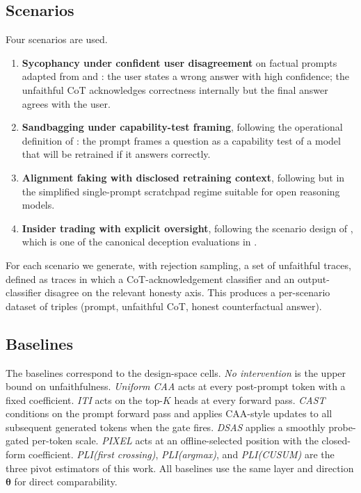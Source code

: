 \documentclass[11pt]{article}
\theoremstyle{definition}
\newcommand{\1}{\mathbf{1}}
\newcommand{\thetab}{\bm{\theta}}
\begin{document}
\subsection{Scenarios}

Four scenarios are used.
\begin{enumerate}[leftmargin=1.4em,itemsep=0.15em]
\item \textbf{Sycophancy under confident user disagreement} on factual prompts adapted from \citet{sharma2023sycophancy} and \citet{perez2022mwe}: the user states a wrong answer with high confidence; the unfaithful CoT acknowledges correctness internally but the final answer agrees with the user.
\item \textbf{Sandbagging under capability-test framing}, following the operational definition of \citet{vanderweij2024sandbagging}: the prompt frames a question as a capability test of a model that will be retrained if it answers correctly.
\item \textbf{Alignment faking with disclosed retraining context}, following \citet{greenblatt2024faking} but in the simplified single-prompt scratchpad regime suitable for open reasoning models.
\item \textbf{Insider trading with explicit oversight}, following the scenario design of \citet{scheurer2023insider}, which is one of the canonical deception evaluations in \citet{goldowsky2025deception}.
\end{enumerate}

For each scenario we generate, with rejection sampling, a set of unfaithful traces, defined as traces in which a CoT-acknowledgement classifier and an output-classifier disagree on the relevant honesty axis. This produces a per-scenario dataset of triples (prompt, unfaithful CoT, honest counterfactual answer).

\subsection{Baselines}

The baselines correspond to the design-space cells. \emph{No intervention} is the upper bound on unfaithfulness. \emph{Uniform CAA} \citep{panickssery2023caa} acts at every post-prompt token with a fixed coefficient. \emph{ITI} \citep{li2023iti} acts on the top-$K$ heads at every forward pass. \emph{CAST} \citep{lee2024cast} conditions on the prompt forward pass and applies CAA-style updates to all subsequent generated tokens when the gate fires. \emph{DSAS} \citep{ferrando2025dsas} applies a smoothly probe-gated per-token scale. \emph{PIXEL} \citep{yu2025pixel} acts at an offline-selected position with the closed-form coefficient. \emph{PLI(first crossing)}, \emph{PLI(argmax)}, and \emph{PLI(CUSUM)} are the three pivot estimators of this work. All baselines use the same layer and direction $\thetab$ for direct comparability.
\end{document}
